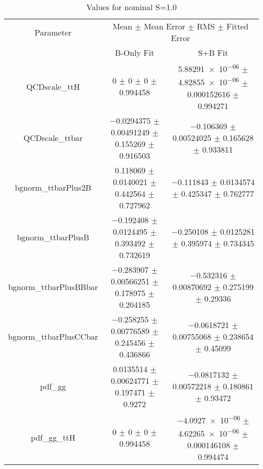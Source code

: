 \begin{table}
\centering
\caption{Values for nominal S=1.0}
\begin{tabular}{ccc}
\toprule
Parameter & \multicolumn{2}{c}{Mean $\pm$ Mean Error $\pm$ RMS $\pm$ Fitted Error}\\
 & B-Only Fit & S+B Fit\\
\midrule
QCDscale\_ttH & \num{0} $\pm$ \num{0} $\pm$ \num{0} $\pm$ \num{0.994458} & \num{5.88291e-06} $\pm$ \num{4.82855e-06} $\pm$ \num{0.000152616} $\pm$ \num{0.994271}\\
QCDscale\_ttbar & \num{-0.0294375} $\pm$ \num{0.00491249} $\pm$ \num{0.155269} $\pm$ \num{0.916503} & \num{-0.106369} $\pm$ \num{0.00524025} $\pm$ \num{0.165628} $\pm$ \num{0.933811}\\
bgnorm\_ttbarPlus2B & \num{0.118069} $\pm$ \num{0.0140021} $\pm$ \num{0.442564} $\pm$ \num{0.727962} & \num{-0.111843} $\pm$ \num{0.0134574} $\pm$ \num{0.425347} $\pm$ \num{0.762777}\\
bgnorm\_ttbarPlusB & \num{-0.192408} $\pm$ \num{0.0124495} $\pm$ \num{0.393492} $\pm$ \num{0.732619} & \num{-0.250108} $\pm$ \num{0.0125281} $\pm$ \num{0.395974} $\pm$ \num{0.734345}\\
bgnorm\_ttbarPlusBBbar & \num{-0.283907} $\pm$ \num{0.00566251} $\pm$ \num{0.178975} $\pm$ \num{0.204185} & \num{-0.532316} $\pm$ \num{0.00870692} $\pm$ \num{0.275199} $\pm$ \num{0.29336}\\
bgnorm\_ttbarPlusCCbar & \num{-0.258255} $\pm$ \num{0.00776589} $\pm$ \num{0.245456} $\pm$ \num{0.436866} & \num{-0.0618721} $\pm$ \num{0.00755068} $\pm$ \num{0.238654} $\pm$ \num{0.45099}\\
pdf\_gg & \num{0.0135514} $\pm$ \num{0.00624771} $\pm$ \num{0.197471} $\pm$ \num{0.9272} & \num{-0.0817132} $\pm$ \num{0.00572218} $\pm$ \num{0.180861} $\pm$ \num{0.93472}\\
pdf\_gg\_ttH & \num{0} $\pm$ \num{0} $\pm$ \num{0} $\pm$ \num{0.994458} & \num{-4.0927e-06} $\pm$ \num{4.62265e-06} $\pm$ \num{0.000146108} $\pm$ \num{0.994474}\\
\bottomrule
\end{tabular}
\end{table}